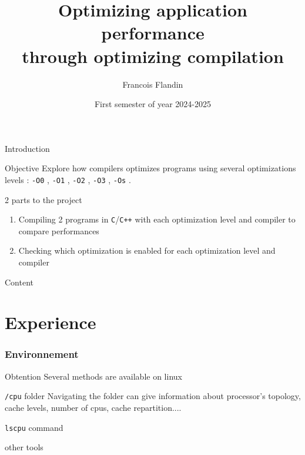 \documentclass[english]{beamer}
\title{Optimizing application performance \\ through optimizing compilation}
\author{Francois Flandin}
\date{First semester of year 2024-2025}
\newcommand{\optizero}{\texttt{-O0} }
\newcommand{\optione}{\texttt{-O1} }
\newcommand{\optitwo}{\texttt{-O2} }
\newcommand{\optithree}{\texttt{-O3} }
\newcommand{\optisize}{\texttt{-Os} }
\begin{document}
    
    \maketitle
    
    \begin{frame}{Introduction}
        \begin{block}{Objective}
            Explore how compilers optimizes programs using several optimizations levels : \optizero, \optione, \optitwo, \optithree, \optisize.
        \end{block}
        \begin{block}{2 parts to the project}
            \begin{enumerate}
            \item Compiling 2 programs in \texttt{C}/\texttt{C++} with each optimization level and compiler to compare performances
            \item Checking which optimization is enabled for each optimization level and compiler
            \end{enumerate}
        \end{block}
    \end{frame}
    
    \begin{frame}[noframenumbering]{Content}
    \tableofcontents
    \end{frame}
    
    \part{Experience}
    \section{Environnement}
    
    \begin{frame}{Obtention}
        Several methods are available on linux
        \begin{block}{\texttt{/cpu} folder}
            Navigating the folder can give information about processor's topology, cache levels, number of cpus, cache repartition....
        \end{block}
        \begin{block}{\texttt{lscpu} command}
        \end{block}
        \begin{block}{other tools}
        \end{block}
    \end{frame}
    
\end{document}
